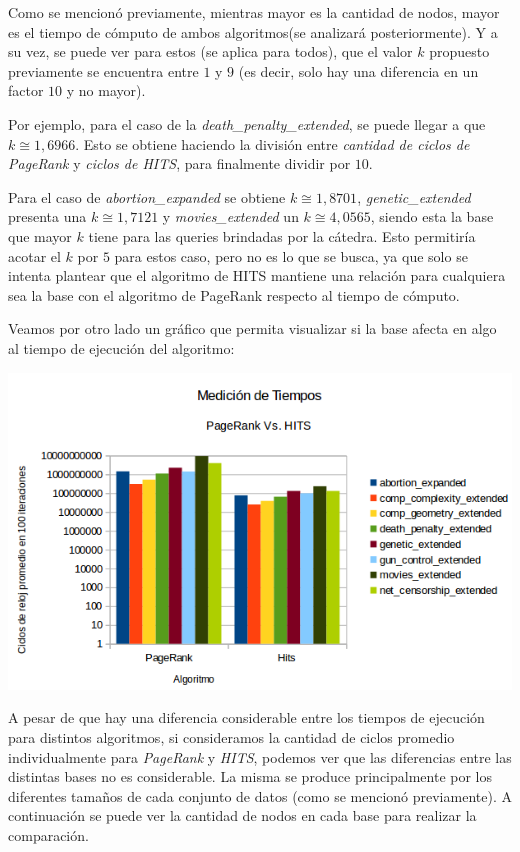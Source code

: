 Como se mencionó previamente, mientras mayor es la cantidad de nodos, mayor es el tiempo de cómputo de ambos algoritmos(se analizará posteriormente). Y a su vez, se puede ver para estos (se aplica para todos), que el valor $k$ propuesto previamente se encuentra entre $1$ y $9$ (es decir, solo hay una diferencia en un factor $10$ y no mayor).
\par 
Por ejemplo, para el caso de la \textit{death\_penalty\_extended}, se puede llegar a que $k \cong 1,6966$. Esto se obtiene haciendo la división entre \textit{cantidad de ciclos de PageRank} y \textit{ciclos de HITS}, para finalmente dividir por $10$. 
\par 
Para el caso de \textit{abortion\_expanded} se obtiene $k \cong 1,8701$, \textit{genetic\_extended} presenta una $ k \cong 1,7121$ y \textit{movies\_extended} un $k \cong 4,0565$, siendo esta la base que mayor $k$ tiene para las queries brindadas por la cátedra. Esto permitiría acotar el $k$ por $5$ para estos caso, pero no es lo que se busca, ya que solo se intenta plantear que el algoritmo de HITS mantiene una relación para cualquiera sea la base con el algoritmo de PageRank respecto al tiempo de cómputo.

Veamos por otro lado un gráfico que permita visualizar si la base afecta en algo al tiempo de ejecución del algoritmo:

	\par 
	\begin{center}
		\includegraphics[scale=0.6]{./img/medicionesTiempo2.png}
	\end{center}
	\par 

A pesar de que hay una diferencia considerable entre los tiempos de ejecución para distintos algoritmos, si consideramos la cantidad de ciclos promedio individualmente para \textit{PageRank} y \textit{HITS}, podemos ver que las diferencias entre las distintas bases no es considerable. La misma se produce principalmente por los diferentes tamaños de cada conjunto de datos (como se mencionó previamente). 
A continuación se puede ver la cantidad de nodos en cada base para realizar la comparación. 

